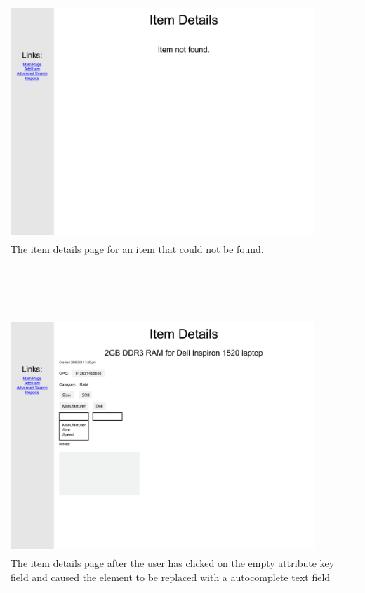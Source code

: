 \documentclass{article}
\begin{document}
\begin{tabular}{ p{4.5in} }
\includegraphics[keepaspectratio, width=4.5in]{viewDetailsF1S1.pdf} \\
The item details page for an item that could not be found.
\end{tabular}\\
~\\
~\\
\begin{tabular}{ p{4.5in} }
\includegraphics[keepaspectratio, width=4.5in]{modifyDetailsF0S1.pdf} \\
The item details page after the user has clicked on the empty attribute key field and caused the element to be replaced with a autocomplete text field
\end{tabular}\\
~\\
~\\
\end{document}
